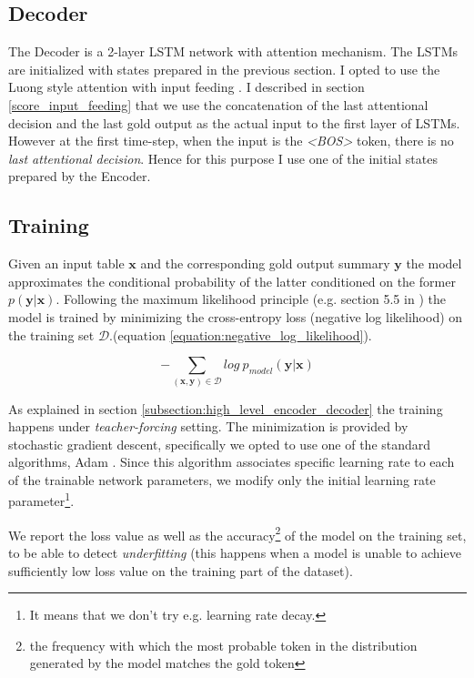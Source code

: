 \subsection{Decoder}

The Decoder is a 2-layer LSTM network with attention mechanism. The LSTMs are initialized with states prepared in the previous section. I opted to use the Luong style attention with input feeding \citep{luong2015effective}. I described in section \ref{score_input_feeding} that we use the concatenation of the last attentional decision and the last gold output as the actual input to the first layer of LSTMs. However at the first time-step, when the input is the \emph{\textless BOS\textgreater} token, there is no \emph{last attentional decision}. Hence for this purpose I use one of the initial states prepared by the Encoder.

\subsection{Training}

Given an input table $\boldsymbol{x}$ and the corresponding gold output summary $\boldsymbol{y}$ the model approximates the conditional probability of the latter conditioned on the former $p(\boldsymbol{y} | \boldsymbol{x})$. Following the maximum likelihood principle (e.g. section 5.5 in \citep{Goodfellow-et-al-2016}) the model is trained by minimizing the cross-entropy loss (negative log likelihood) on the training set $\mathcal{D}$.(equation \ref{equation:negative_log_likelihood}).

\begin{equation} \label{equation:negative_log_likelihood}
    - \sum_{(\boldsymbol{x}, \boldsymbol{y}) \in \mathcal{D}}{log\ p_{model}(\boldsymbol{y} | \boldsymbol{x})}
\end{equation}

As explained in section \ref{subsection:high_level_encoder_decoder} the training happens under \emph{teacher-forcing} setting. The minimization is provided by stochastic gradient descent, specifically we opted to use one of the standard algorithms, Adam \citep{kingma2014adam}. Since this algorithm associates specific learning rate to each of the trainable network parameters, we modify only the initial learning rate parameter\footnote{It means that we don't try e.g. learning rate decay.}.

We report the loss value as well as the accuracy\footnote{the frequency with which the most probable token in the distribution generated by the model matches the gold token} of the model on the training set, to be able to detect \emph{underfitting} (this happens when a model is unable to achieve sufficiently low loss value on the training part of the dataset).

